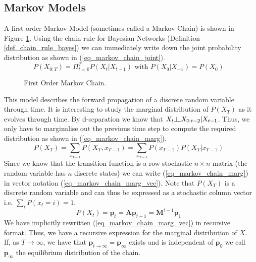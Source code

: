 \subsection{Markov Models}
A first order Markov Model (sometimes called a Markov Chain) is shown in Figure \ref{fig_markov_chain}. Using the chain rule for Bayesian Networks (Definition \ref{def_chain_rule_bayes}) we can immediately write down the joint probability distribution as shown in (\ref{eq_markov_chain_joint}).
\begin{equation}
P(X_{0:T}) = \Pi_{t=0}^T P(X_t|X_{t-1}) \text{ with } P(X_0|X_{-1}) = P(X_0)
\label{eq_markov_chain_joint}
\end{equation}  
\begin{figure}[H] 
\centering
{}
\caption{First Order Markov Chain.}
\label{fig_markov_chain}
\end{figure}
This model describes the forward propagation of a discrete random variable through time. It is interesting to study the marginal distribution of $P(X_T)$ as it evolves through time. By d-separation we know that $X_t \indep X_{0:t-2} | X_{t-1}$. Thus, we only have to marginalise out the previous time step to compute the required distribution as shown in (\ref{eq_markov_chain_marg}).
\begin{equation}
P(X_T) = \sum_{x_{T-1}} P(X_T, x_{T-1}) = \sum_{x_{T-1}} P(x_{T-1})P(X_T|x_{T-1})
\label{eq_markov_chain_marg}
\end{equation}
Since we know that the transition function is a row stochastic $n \times n$ matrix (the random variable has $n$ discrete states) we can write (\ref{eq_markov_chain_marg}) in vector notation (\ref{eq_markov_chain_marg_vec}). Note that $P(X_T)$ is a discrete random variable and can thus be expressed as a stochastic column vector i.e. $\sum_i P(x_t=i) = 1$.
\begin{equation}
P(X_t) = \mathbf{p}_t = \mathbf{A}\mathbf{p}_{t-1} = \mathbf{M}^{t-1}\mathbf{p}_1
\label{eq_markov_chain_marg_vec}
\end{equation}
We have implicitly rewritten (\ref{eq_markov_chain_marg_vec}) in recursive format. Thus, we have a recursive expression for the marginal distribution of $X$. If, as $T \rightarrow \infty$, we have that $\mathbf{p}_{t \rightarrow \infty} = \mathbf{p}_{\infty}$ exists and is independent of $\mathbf{p}_0$ we call $\mathbf{p}_{\infty}$ the equilibrium distribution of the chain. 

